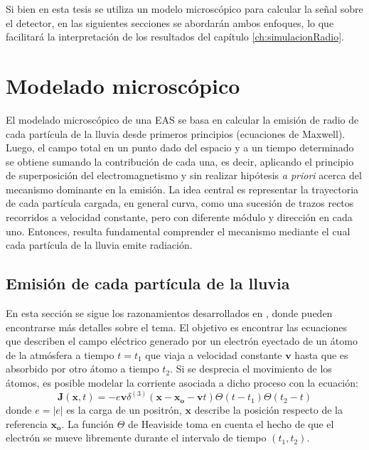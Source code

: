 Si bien en esta tesis se utiliza un modelo microsc\'opico para calcular la se\~nal sobre el detector, en las siguientes secciones se abordar\'an ambos enfoques, lo que facilitar\'a la interpretaci\'on de los resultados del cap\'itulo \ref{ch:simulacionRadio}.

\section{Modelado microsc\'opico}

El modelado microsc\'opico de una EAS se basa en calcular la emisi\'on de radio de cada part\'icula de la lluvia desde primeros principios (ecuaciones de Maxwell).
Luego, el campo total en un punto dado del espacio y a un tiempo determinado se obtiene sumando la contribuci\'on de cada una, es decir, aplicando el principio de superposici\'on del electromagnetismo y sin realizar hip\'otesis \emph{a priori} acerca del mecanismo dominante en la emisi\'on.
La idea central es representar la trayectoria de cada part\'icula cargada, en general curva, como una sucesi\'on de trazos rectos recorridos a velocidad constante, pero con diferente m\'odulo y direcci\'on en cada uno.
Entonces, resulta fundamental comprender el mecanismo mediante el cual cada part\'icula de la lluvia emite radiaci\'on.

\subsection{Emisi\'on de cada part\'icula de la lluvia}

En esta secci\'on se sigue los razonamientos desarrollados en \cite{alvarez:2013}, donde pueden encontrarse m\'as detalles sobre el tema.
El objetivo es encontrar las ecuaciones que describen el campo el\'ectrico generado por un electr\'on eyectado de un \'atomo de la atm\'osfera a tiempo $t=t_1$ que viaja a velocidad constante $\mathbf{v}$ hasta que es absorbido por otro \'atomo a tiempo $t_2$.
Si se desprecia el movimiento de los \'atomos, es posible modelar la corriente asociada a dicho proceso con la ecuaci\'on:
%
\begin{equation}
\mathbf{J}(\mathbf{x},t)=-e\mathbf{v}\delta^{(3)}(\mathbf{x}-\mathbf{x_o}-\mathbf{v}t)
\Theta(t-t_1)\Theta(t_2-t)
\label{eq:eCurrent}
\end{equation}
%
donde $e=|e|$ es la carga de un positr\'on, $\mathbf{x}$ describe la posici\'on respecto de la referencia $\mathbf{x_o}$.
La funci\'on $\Theta$ de Heaviside toma en cuenta el hecho de que el electr\'on se mueve libremente durante el intervalo de tiempo $(t_1,t_2)$.

